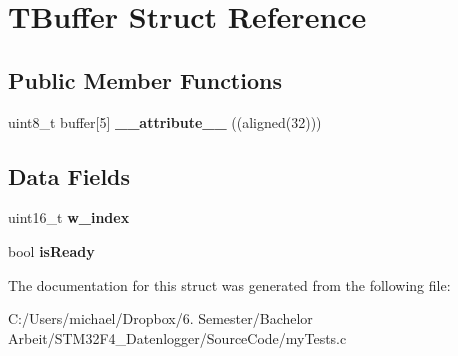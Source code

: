 \hypertarget{struct_t_buffer}{}\section{T\+Buffer Struct Reference}
\label{struct_t_buffer}
\subsection*{Public Member Functions}
\begin{DoxyCompactItemize}
\item 
\hypertarget{struct_t_buffer_a63831e0b81ee9c12b2e3fefc6e24a52d}{}uint8\+\_\+t buffer\mbox{[}5\mbox{]} {\bfseries \+\_\+\+\_\+attribute\+\_\+\+\_\+} ((aligned(32)))\label{struct_t_buffer_a63831e0b81ee9c12b2e3fefc6e24a52d}

\end{DoxyCompactItemize}
\subsection*{Data Fields}
\begin{DoxyCompactItemize}
\item 
\hypertarget{struct_t_buffer_a5f56222f10a6cb328eaf759e2795117c}{}uint16\+\_\+t {\bfseries w\+\_\+index}\label{struct_t_buffer_a5f56222f10a6cb328eaf759e2795117c}

\item 
\hypertarget{struct_t_buffer_a1f1586f3013bbd3b99be7275eec73e76}{}bool {\bfseries is\+Ready}\label{struct_t_buffer_a1f1586f3013bbd3b99be7275eec73e76}

\end{DoxyCompactItemize}


The documentation for this struct was generated from the following file\+:\begin{DoxyCompactItemize}
\item 
C\+:/\+Users/michael/\+Dropbox/6. Semester/\+Bachelor Arbeit/\+S\+T\+M32\+F4\+\_\+\+Datenlogger/\+Source\+Code/my\+Tests.\+c\end{DoxyCompactItemize}

